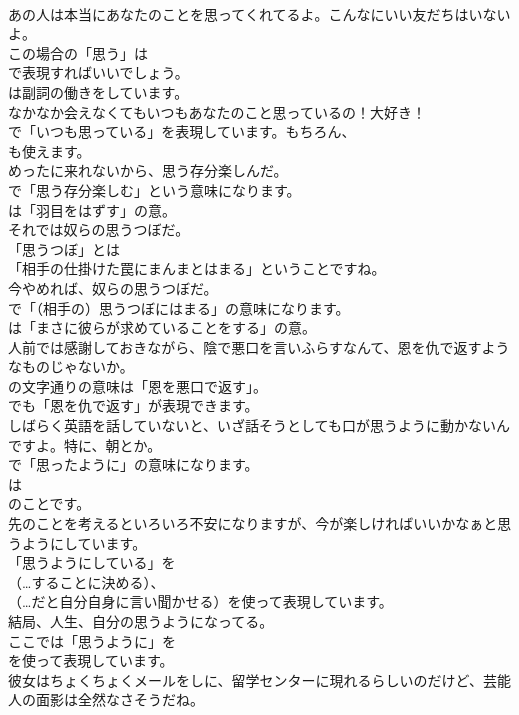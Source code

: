 \documentclass[8pt]{extreport}
\begin{document}
\begin{CJK}{UTF8}{min}
\\	あの人は本当にあなたのことを思ってくれてるよ。こんなにいい友だちはいないよ。 
\\	この場合の「思う」は 
\\	で表現すればいいでしょう。
\\	は副詞の働きをしています。	
\\	なかなか会えなくてもいつもあなたのこと思っているの！大好き！ 
\\	で「いつも思っている」を表現しています。もちろん、
\\	も使えます。	
\\	めったに来れないから、思う存分楽しんだ。 
\\	で「思う存分楽しむ」という意味になります。
\\	は「羽目をはずす」の意。	
\\	それでは奴らの思うつぼだ。 
\\	「思うつぼ」とは
\\	「相手の仕掛けた罠にまんまとはまる」ということですね。	
\\	今やめれば、奴らの思うつぼだ。 
\\	で「（相手の）思うつぼにはまる」の意味になります。
\\	は「まさに彼らが求めていることをする」の意。	
\\	人前では感謝しておきながら、陰で悪口を言いふらすなんて、恩を仇で返すようなものじゃないか。 
\\	の文字通りの意味は「恩を悪口で返す」。
\\	でも「恩を仇で返す」が表現できます。	
\\	しばらく英語を話していないと、いざ話そうとしても口が思うように動かないんですよ。特に、朝とか。 
\\	で「思ったように」の意味になります。
\\	は 
\\	のことです。	
\\	先のことを考えるといろいろ不安になりますが、今が楽しければいいかなぁと思うようにしています。 
\\	「思うようにしている」を 
\\	（…することに決める）、
\\	（…だと自分自身に言い聞かせる）を使って表現しています。	
\\	結局、人生、自分の思うようになってる。 
\\	ここでは「思うように」を
\\	を使って表現しています。	
\\	彼女はちょくちょくメールをしに、留学センターに現れるらしいのだけど、芸能人の面影は全然なさそうだね。 

\end{CJK}
\end{document}
